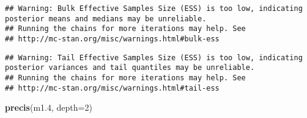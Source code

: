 \documentclass[
]{article}
\newenvironment{Shaded}{\begin{snugshade}}{\end{snugshade}}
\newcommand{\DataTypeTok}[1]{\textcolor[rgb]{0.13,0.29,0.53}{#1}}
\newcommand{\DecValTok}[1]{\textcolor[rgb]{0.00,0.00,0.81}{#1}}
\newcommand{\FloatTok}[1]{\textcolor[rgb]{0.00,0.00,0.81}{#1}}
\newcommand{\KeywordTok}[1]{\textcolor[rgb]{0.13,0.29,0.53}{\textbf{#1}}}
\newcommand{\NormalTok}[1]{#1}
\begin{document}
\begin{verbatim}
## Warning: Bulk Effective Samples Size (ESS) is too low, indicating posterior means and medians may be unreliable.
## Running the chains for more iterations may help. See
## http://mc-stan.org/misc/warnings.html#bulk-ess
\end{verbatim}

\begin{verbatim}
## Warning: Tail Effective Samples Size (ESS) is too low, indicating posterior variances and tail quantiles may be unreliable.
## Running the chains for more iterations may help. See
## http://mc-stan.org/misc/warnings.html#tail-ess
\end{verbatim}

\begin{Shaded}
\begin{Highlighting}[]
\KeywordTok{precis}\NormalTok{(m1}\FloatTok{.4}\NormalTok{, }\DataTypeTok{depth=}\DecValTok{2}\NormalTok{)}
\end{Highlighting}
\end{Shaded}
\end{document}
